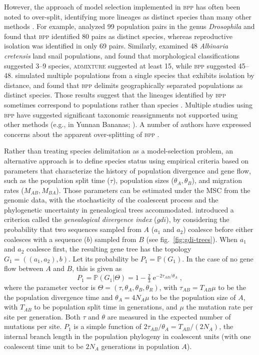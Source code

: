 \documentclass{article1}
\renewcommand{\P}{\mathbb{P}}
\DeclareMathOperator{\e}{\mathrm{e}}
\begin{document}
However, the approach of model selection implemented in \textsc{bpp} has often been
noted to over-split, identifying more lineages as distinct species than many other
methods \citep{Sukumaran2017}.  For example, \cite{Campillo2020} analyzed 99 population
pairs in the genus \textit{Drosophila} and found that \textsc{bpp} identified 80 pairs
as distinct species, whereas reproductive isolation was identified in only 69 pairs.
Similarly, \citet{Bamberger2022} examined 48 \textit{Albinaria cretensis} land snail
populations, and found that morphological classifications suggested 3--9 species,
\textsc{admixture} suggested at least 15, while \textsc{bpp} suggested 45--48.
\citet{Barley2018} simulated multiple populations from a single species that exhibits
isolation by distance, and found that \textsc{bpp} delimits geographically separated
populations as distinct species. Those results suggest that the lineages identified by
\textsc{bpp} sometimes correspond to populations rather than species
\citep{Chambers2020}. Multiple studies using \textsc{bpp} have suggested significant
taxonomic reassignments not supported using other methods (e.g., in Yunnan Bananas;
\citealp{Wu2018}).  A number of authors have expressed concerns about the apparent
over-splitting of \textsc{bpp} \citep{MacGuigan2021}.

Rather than treating species delimitation as a model-selection problem, an alternative
approach is to define species status using empirical criteria based on parameters that
characterize the history of population divergence and gene flow, such as the population
split time ($\tau$), population sizes ($\theta_A, \theta_B$), and migration rates
($M_{AB}, M_{BA}$).  Those parameters can be estimated under the MSC from the genomic
data, with the stochasticity of the coalescent process and the phylogenetic uncertainty in
genealogical trees accommodated.  \citet{Jackson2017} introduced a criterion called the
\textit{genealogical divergence index} ($gdi$), by considering the probability that
two sequences sampled from $A$ ($a_1$ and $a_2$) coalesce before either coalesces with a
sequence ($b$) sampled from $B$ (see fig.~\ref{fig:gdi-trees}).  When $a_1$ and $a_2$
coalesce first, the resulting gene tree has the topology $G_1 = ((a_1, a_2), b)$.  Let its
probability be $P_1 = \P(G_1)$.  In the case of no gene flow between $A$ and $B$, this is
given as
\begin{equation} \label{eq:PG1_M0}
   P_1 = \P(G_1|\Theta) = 1 - \tfrac{2}{3} \e^{-2 \tau_{AB} / \theta_A},
\end{equation} 
where the parameter vector is $\Theta = (\tau, \theta_A, \theta_B, \theta_R)$, with
$\tau_{AB} = T_{AB}\mu$ to be the the population divergence time and $\theta_A =
4N_A\mu$ to be the population size of $A$, with $T_{AB}$ to be population split time in
generations, and $\mu$ the mutation rate per site per generation.  Both $\tau$ and
$\theta$ are measured in the expected number of mutations per site.  $P_1$ is a simple
function of $2\tau_{AB}/\theta_A = T_{AB}/(2N_A)$, the internal branch length in the
population phylogeny in coalescent units (with one coalescent time unit to be $2N_A$
generations in population $A$).
\end{document}
